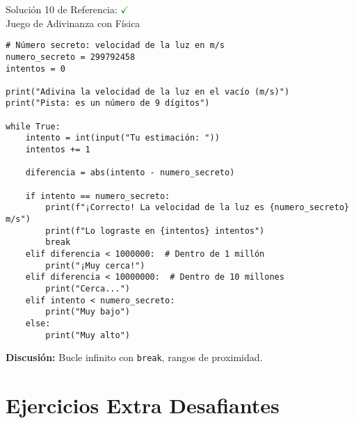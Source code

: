 \documentclass[10pt]{beamer}
\begin{document}
\begin{frame}[fragile]{Solución 10 de Referencia: \hfill \textcolor{green}{$\checkmark$} \\ Juego de Adivinanza con Física}
\begin{verbatim}
# Número secreto: velocidad de la luz en m/s
numero_secreto = 299792458
intentos = 0

print("Adivina la velocidad de la luz en el vacío (m/s)")
print("Pista: es un número de 9 dígitos")

while True:
    intento = int(input("Tu estimación: "))
    intentos += 1
    
    diferencia = abs(intento - numero_secreto)
    
    if intento == numero_secreto:
        print(f"¡Correcto! La velocidad de la luz es {numero_secreto} m/s")
        print(f"Lo lograste en {intentos} intentos")
        break
    elif diferencia < 1000000:  # Dentro de 1 millón
        print("¡Muy cerca!")
    elif diferencia < 10000000:  # Dentro de 10 millones
        print("Cerca...")
    elif intento < numero_secreto:
        print("Muy bajo")
    else:
        print("Muy alto")
\end{verbatim}
\textbf{Discusión:} Bucle infinito con \texttt{break}, rangos de proximidad.
\end{frame}

\section{Ejercicios Extra Desafiantes}
\end{document}
